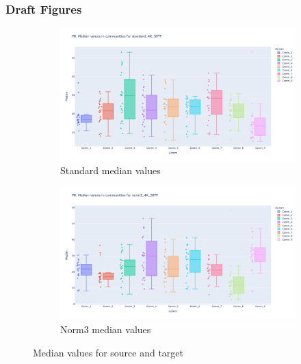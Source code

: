 \subsubsection{Draft Figures}


\begin{figure}
\captionsetup[subfigure]{justification=Centering}
\begin{subfigure}[t]{1.0\textwidth}
    \includegraphics[width=\textwidth]{Images/P0/standard_4K_50TF_median.png}
    \caption{Standard median values}
\end{subfigure}\hspace{\fill} %

\bigskip %
\begin{subfigure}[t]{1.0\textwidth}
    \includegraphics[width=\linewidth]{Images/P0/norm3_4K_50TF_median.png}
    \caption{Norm3 median values}
\end{subfigure}\hspace{\fill} %

\caption{Median values for source and target}
\label{fig:N_I:P0_median}
\end{figure}


